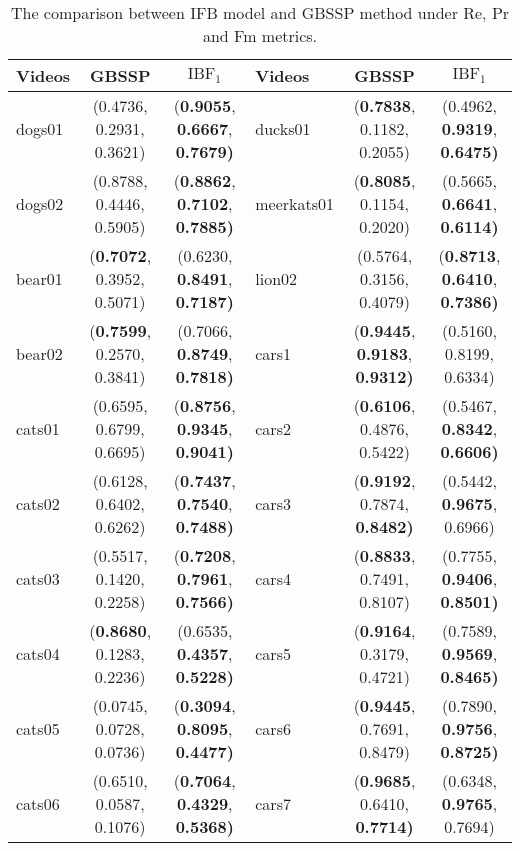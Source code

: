 \begin{table*}[!t]				%
\caption{The comparison between IFB model and GBSSP method under Re, Pr and Fm metrics.}
\label{tab_FBMS}					%
\centering
\begin{tabular}{lcc|lcc}
\hline
Videos & GBSSP & $\text{IBF}_1$ &  Videos & GBSSP & $\text{IBF}_1$  \\
\hline
      dogs01 &  (0.4736, 0.2931, 0.3621) &  (\textbf{0.9055}, \textbf{0.6667}, \textbf{0.7679)} &     ducks01 &  (\textbf{0.7838}, 0.1182, 0.2055) &  (0.4962, \textbf{0.9319}, \textbf{0.6475)} \\
      dogs02 &  (0.8788, 0.4446, 0.5905) &  (\textbf{0.8862}, \textbf{0.7102}, \textbf{0.7885)} &  meerkats01 &  (\textbf{0.8085}, 0.1154, 0.2020) &  (0.5665, \textbf{0.6641}, \textbf{0.6114)} \\
      bear01 &  (\textbf{0.7072}, 0.3952, 0.5071) &  (0.6230, \textbf{0.8491}, \textbf{0.7187)} &      lion02 &  (0.5764, 0.3156, 0.4079) &  (\textbf{0.8713}, \textbf{0.6410}, \textbf{0.7386)} \\
      bear02 &  (\textbf{0.7599}, 0.2570, 0.3841) &  (0.7066, \textbf{0.8749}, \textbf{0.7818)} &       cars1 &  (\textbf{0.9445}, \textbf{0.9183}, \textbf{0.9312)} &  (0.5160, 0.8199, 0.6334) \\
      cats01 &  (0.6595, 0.6799, 0.6695) &  (\textbf{0.8756}, \textbf{0.9345}, \textbf{0.9041)} &       cars2 &  (\textbf{0.6106}, 0.4876, 0.5422) &  (0.5467, \textbf{0.8342}, \textbf{0.6606)} \\
      cats02 &  (0.6128, 0.6402, 0.6262) &  (\textbf{0.7437}, \textbf{0.7540}, \textbf{0.7488)} &       cars3 &  (\textbf{0.9192}, 0.7874, \textbf{0.8482)} &  (0.5442, \textbf{0.9675}, 0.6966) \\
      cats03 &  (0.5517, 0.1420, 0.2258) &  (\textbf{0.7208}, \textbf{0.7961}, \textbf{0.7566)} &       cars4 &  (\textbf{0.8833}, 0.7491, 0.8107) &  (0.7755, \textbf{0.9406}, \textbf{0.8501)} \\
      cats04 &  (\textbf{0.8680}, 0.1283, 0.2236) &  (0.6535, \textbf{0.4357}, \textbf{0.5228)} &       cars5 &  (\textbf{0.9164}, 0.3179, 0.4721) &  (0.7589, \textbf{0.9569}, \textbf{0.8465)} \\
      cats05 &  (0.0745, 0.0728, 0.0736) &  (\textbf{0.3094}, \textbf{0.8095}, \textbf{0.4477)} &       cars6 &  (\textbf{0.9445}, 0.7691, 0.8479) &  (0.7890, \textbf{0.9756}, \textbf{0.8725)} \\
      cats06 &  (0.6510, 0.0587, 0.1076) &  (\textbf{0.7064}, \textbf{0.4329}, \textbf{0.5368)} &       cars7 &  (\textbf{0.9685}, 0.6410, \textbf{0.7714)} &  (0.6348, \textbf{0.9765}, 0.7694) \\

\end{tabular}
\end{table*}
